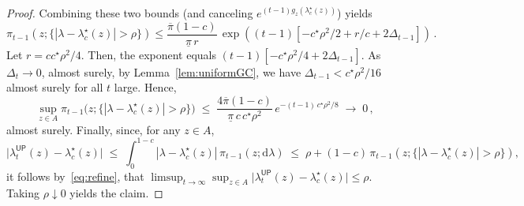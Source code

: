 \documentclass[10pt,a4paper]{amsart}
\newcommand{\fbet}{\lambda}  %
\newcommand{\up}{\mathsf{UP}}
\begin{document}
\begin{proof}
Combining these two bounds (and canceling
$e^{(t-1)g_z(\fbet^\star_c(z))}$) yields
\begin{equation*}
    \pi_{t-1}\left(z;\{|\lambda-\fbet^\star_c(z)|>\rho\}\right)
   \leq\frac{\overline\pi(1-c)}{\underline\pi\, r}\,
    \exp\left((t-1)[-c^\star\rho^2/2 + r/c + 2\Delta_{t-1}]\right)\,.
\end{equation*}
Let $r = cc^\star\rho^2/4$. Then, the
exponent equals $(t-1)[-c^\star\rho^2/4+2\Delta_{t-1}]$. As $\Delta_t\to0$, almost surely, by Lemma~\ref{lem:uniformGC}, we have
$\Delta_{t-1}<c^\star\rho^2/16$ almost surely for all $t$ large. Hence,
\begin{equation}\label{eq:refine}
    \sup_{z\in A}\pi_{t-1}\bigl(z;\{|\lambda-\fbet^\star_c(z)|>\rho\}\bigr)
    \;\le\;\frac{4\overline\pi(1-c)}{\underline\pi\, c\, c^\star\rho^2}\,
    e^{-(t-1)\,c^\star\rho^2/8}\;\to\;0\,,
\end{equation}
almost surely. Finally, since, for any $z\in A$,
\begin{equation*}
    \bigl|\fbet_t^\up(z)-\fbet^\star_c(z)\bigr|
    \;\le\; \int_0^{1-c}|\lambda-\fbet^\star_c(z)|\,\pi_{t-1}(z;\mathrm{d}\lambda)
    \;\le\; \rho + (1-c)\,\pi_{t-1}(z;\{|\lambda-\fbet^\star_c(z)|>\rho\}),
\end{equation*}
it follows by~\eqref{eq:refine}, that $\limsup_{t\to\infty} \sup_{z\in A}|\fbet_t^\up(z)-\fbet^\star_c(z)\bigr| \leq \rho.$ Taking $\rho\downarrow 0$ yields the claim.
\end{proof}
\end{document}
